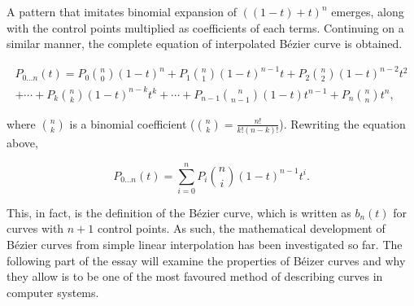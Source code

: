 \documentclass[11pt, oneside]{article}
\theoremstyle{definition}
\numberwithin{figure}{section}
\begin{document}
A pattern that imitates binomial expansion of $((1-t) + t)^n$ emerges, along with the control points multiplied as coefficients of each terms. Continuing on a similar manner, the complete equation of interpolated B\'ezier curve is obtained.

\begin{multline}
P_{0 \dotsc n}(t) = 	P_0 \binom{n}{0}(1-t)^n + P_1 \binom{n}{1}(1-t)^{n-1}t + P_2 \binom{n}{2}(1-t)^{n-2}t^2 \\
				+ \dotsb + P_k \binom{n}{k}(1-t)^{n-k}t^k + \dotsb + P_{n-1} \binom{n}{n-1}(1-t)t^{n-1} + P_n \binom{n}{n}t^n,
\end{multline}

where $\binom{n}{k}$ is a binomial coefficient ($\binom{n}{k} = \frac{n!}{k!(n-k)!}$). Rewriting the equation above,

\begin{equation}
P_{0 \dotsc n}(t) = \sum_{i=0}^{n} {P_i \binom{n}{i} (1-t)^{n-1} t^i}.
\end{equation}

This, in fact, is the definition of the B\'ezier curve, which is written as $b_n(t)$ for curves with $n+1$ control points. As such, the mathematical development of B\'ezier curves from simple linear interpolation has been investigated so far. The following part of the essay will examine the properties of B\'eizer curves and why they allow is to be one of the most favoured method of describing curves in computer systems.

\newpage



\end{document}
